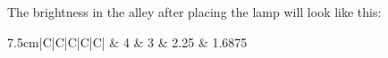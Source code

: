 \nextsample{}
The brightness in the alley after placing the lamp will look like this:

\begin{tabularx}{7.5cm}{|C|C|C|C|C|}
	 & 4 & 3 & 2.25 & 1.6875 \\
	\hline
\end{tabularx}